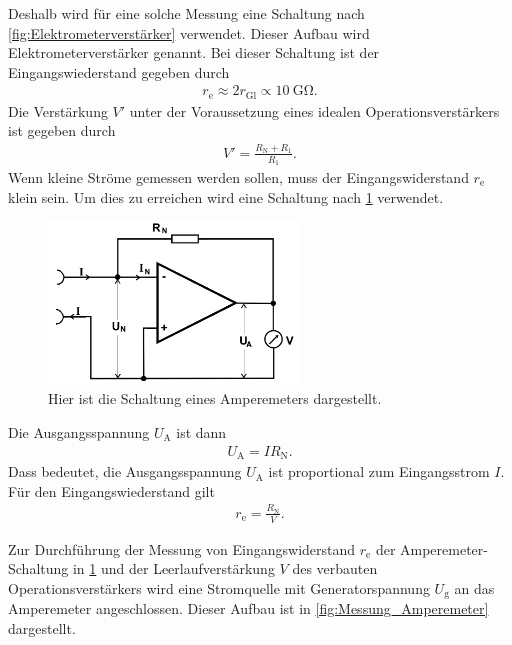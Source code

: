 Deshalb wird für eine solche Messung eine Schaltung nach \cref{fig:Elektrometerverstärker} verwendet.
Dieser Aufbau wird Elektrometerverstärker genannt.
Bei dieser Schaltung ist der Eingangswiederstand gegeben durch
\begin{align}
	r_\text{e}\approx 2r_\text{Gl}\propto \SI{10}{\giga\ohm}.
\end{align}
Die Verstärkung $V'$ unter der Voraussetzung eines idealen Operationsverstärkers ist gegeben durch
\begin{align}
	V'=\frac{R_\text{N}+R_1}{R_1 }.
\end{align}
\newpage
\indent
Wenn kleine Ströme gemessen werden sollen, muss der Eingangswiderstand $r_\text{e}$ klein sein.
Um dies zu erreichen wird eine Schaltung nach \cref{fig:Amperemeter} verwendet.
\begin{figure}[h!]
	\centering
	\includegraphics[width = 0.6\textwidth]{../Grafiken/Amperemeter.png}
	\caption{Hier ist die Schaltung eines Amperemeters dargestellt. \cite{V51}\label{fig:Amperemeter}}
\end{figure}
\FloatBarrier
Die Ausgangsspannung $U_\text{A}$ ist dann
\begin{align}
	U_\text{A}=IR_\text{N}.\label{eq:amperemeter_strom}
\end{align}
Dass bedeutet, die Ausgangsspannung $U_\text{A}$ ist proportional zum Eingangsstrom $I$.
Für den Eingangswiederstand gilt\\
\begin{align*}
	r_\text{e}=\frac{R_\text{N}}{V}.
	\label{eq:eingangswiderstand}
\end{align*}

Zur Durchführung der Messung von Eingangswiderstand $r_{\mathrm{e}}$ der Amperemeter-Schaltung  in 
\cref{fig:Amperemeter} und der Leerlaufverstärkung $V$ des verbauten Operationsverstärkers wird eine Stromquelle mit 
Generatorspannung $U_{\mathrm{g}}$ an das Amperemeter angeschlossen. Dieser Aufbau ist in 
\cref{fig:Messung_Amperemeter} dargestellt.


